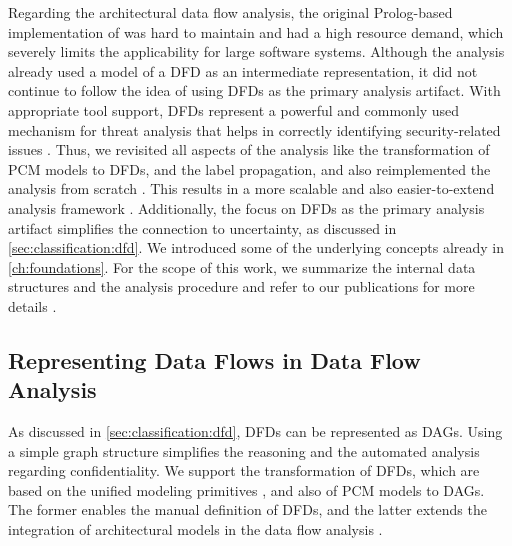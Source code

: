 Regarding the architectural data flow analysis, the original Prolog-based implementation of \textcite{seifermann_architectural_2022} was hard to maintain and had a high resource demand, which severely limits the applicability for large software systems.
Although the analysis already used a model of a \ac{DFD} \cite{demarco_structure_1979} as an intermediate representation, it did not continue to follow the idea of using \acp{DFD} as the primary analysis artifact. 
With appropriate tool support, \acp{DFD} represent a powerful and commonly used mechanism for threat analysis \cite{bernsmed_adopting_2022} that helps in correctly identifying security-related issues \cite{schneider_how_2024}.
Thus, we revisited all aspects of the analysis like the transformation of \ac{PCM} models to \acp{DFD}, and the label propagation, and also reimplemented the analysis from scratch \cite{schwickerath_tool-supported_2023}.
This results in a more scalable and also easier-to-extend analysis framework \cite{boltz_extensible_2024}.
Additionally, the focus on \acp{DFD} as the primary analysis artifact simplifies the connection to uncertainty, as discussed in \autoref{sec:classification:dfd}. 
We introduced some of the underlying concepts already in \autoref{ch:foundations}.
For the scope of this work, we summarize the internal data structures and the analysis procedure and refer to our publications for more details \cite{schwickerath_tool-supported_2023,boltz_extensible_2024,hahner_modeling_2021}.


\subsection{Representing Data Flows in Data Flow Analysis}

As discussed in \autoref{sec:classification:dfd}, \acp{DFD} can be represented as \acfp{DAG}.
Using a simple graph structure simplifies the reasoning and the automated analysis regarding confidentiality.
We support the transformation of \acp{DFD}, which are based on the unified modeling primitives \cite{seifermann_unified_2021}, and also of \ac{PCM} models \cite{reussner_modeling_2016} to \acp{DAG}.
The former enables the manual definition of \acp{DFD}, and the latter extends the integration of architectural models in the data flow analysis \cite{seifermann_data-driven_2019}.


